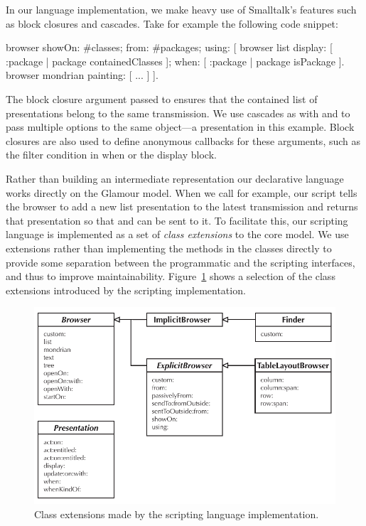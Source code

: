 \documentclass[a4paper,10pt,twoside]{book}
\begin{document}
In our language implementation, we make heavy use of Smalltalk's
features such as block closures and cascades. Take for example the
following code snippet:

\begin{code}{}
browser showOn: #classes; from: #packages; using: [
	browser list
		display: [ :package | package containedClasses ];
		when: [ :package | package isPackage ].
	browser mondrian painting: [ ... ]
].
\end{code}

The block closure argument passed to  ensures that the contained list of presentations belong to the same transmission. We use cascades as with  and  to pass multiple options to the same object---a presentation in this example. Block closures are also used to define anonymous callbacks for these arguments, such as the filter condition in when or the display block. 

Rather than building an intermediate representation our declarative language works directly on the Glamour model. When we call  for example, our script tells the browser to add a new list presentation to the latest transmission and returns that presentation so that  and  can be sent to it. To facilitate this, our scripting language is implemented as a set of \emph{class extensions} to the core model. We use extensions rather than implementing the methods in the classes directly to provide some separation between the programmatic and the scripting interfaces, and thus to improve maintainability. Figure~\ref{fig:uml-script_extensions} shows a selection of the class extensions introduced by the scripting implementation.

\begin{figure}[htbp]
\centerline{\includegraphics[width=\linewidth]{script_extensions.pdf}}
\caption{Class extensions made by the scripting language implementation.}
\label{fig:uml-script_extensions}
\end{figure}
\end{document}
